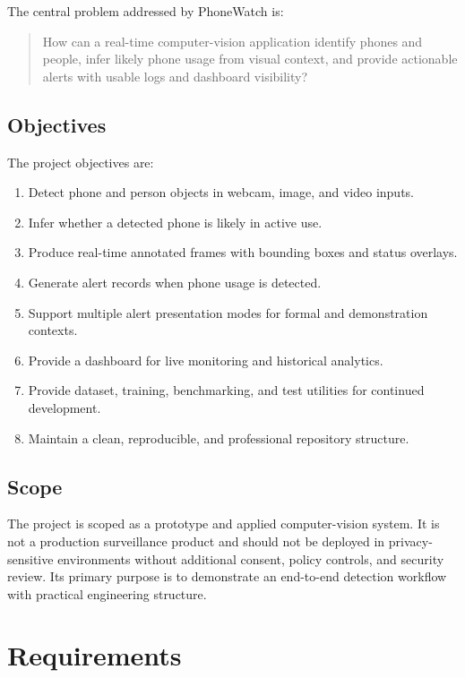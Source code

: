 \documentclass[12pt,a4paper]{report}
\newcommand{\projectname}{PhoneWatch}
\begin{document}
The central problem addressed by \projectname{} is:

\begin{quote}
How can a real-time computer-vision application identify phones and people, infer likely phone usage from visual context, and provide actionable alerts with usable logs and dashboard visibility?
\end{quote}

\section{Objectives}

The project objectives are:

\begin{enumerate}
  \item Detect phone and person objects in webcam, image, and video inputs.
  \item Infer whether a detected phone is likely in active use.
  \item Produce real-time annotated frames with bounding boxes and status overlays.
  \item Generate alert records when phone usage is detected.
  \item Support multiple alert presentation modes for formal and demonstration contexts.
  \item Provide a dashboard for live monitoring and historical analytics.
  \item Provide dataset, training, benchmarking, and test utilities for continued development.
  \item Maintain a clean, reproducible, and professional repository structure.
\end{enumerate}

\section{Scope}

The project is scoped as a prototype and applied computer-vision system. It is not a production surveillance product and should not be deployed in privacy-sensitive environments without additional consent, policy controls, and security review. Its primary purpose is to demonstrate an end-to-end detection workflow with practical engineering structure.

\chapter{Requirements}
\end{document}
